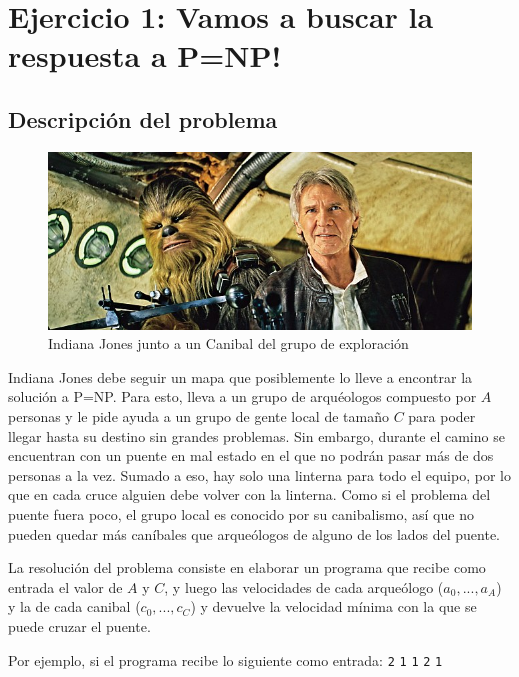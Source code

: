 \section{Ejercicio 1: Vamos a buscar la respuesta a P=NP!}
    \subsection{Descripción del problema}
		\begin{figure}[ht]
			\begin{center}
				\includegraphics[width=0.5\columnwidth]{imagenes/expedicionistas.jpg}
				\caption{Indiana Jones junto a un Canibal del grupo de exploración}
			\end{center}
		\end{figure}
        Indiana Jones debe seguir un mapa que posiblemente lo lleve a encontrar la solución a P=NP. Para esto, lleva a un grupo de arquéologos compuesto por $A$ personas y le pide ayuda a un grupo de gente local de tamaño $C$ para poder llegar hasta su destino sin grandes problemas. Sin embargo, durante el camino se encuentran con un puente en mal estado en el que no podrán pasar más de dos personas a la vez. Sumado a eso, hay solo una linterna para todo el equipo, por lo que en cada cruce alguien debe volver con la linterna. Como si el problema del puente fuera poco, el grupo local es conocido por su canibalismo, así que no pueden quedar más caníbales que arqueólogos de alguno de los lados del puente.

        La resolución del problema consiste en elaborar un programa que recibe como entrada el valor de $A$ y $C$, y luego las velocidades de cada arqueólogo ($a_0, ... , a_A$) y la de cada canibal ($c_0, ... , c_C$) y devuelve la velocidad mínima con la que se puede cruzar el puente.

        Por ejemplo, si el programa recibe lo siguiente como entrada: \newline
        \texttt{2} \texttt{1} \newline
        \texttt{1} \texttt{2} \newline
        \texttt{1}


